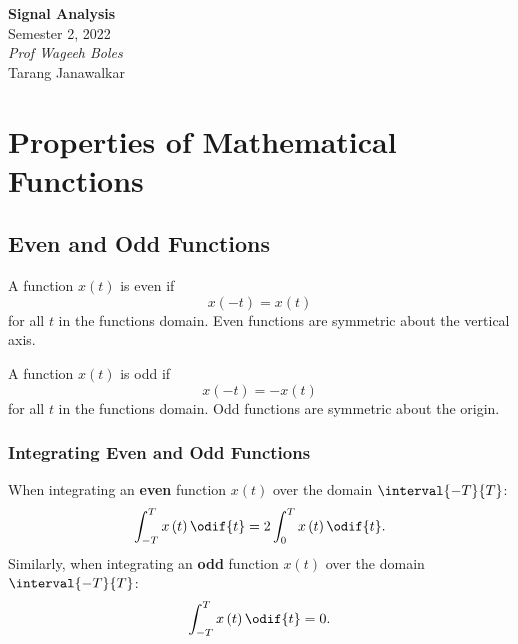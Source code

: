 \documentclass{article}
\date{}
\newcommand{\unitName}{Signal Analysis}
\newcommand{\unitTime}{Semester 2, 2022}
\newcommand{\unitCoordinator}{Prof Wageeh Boles}
\newcommand{\documentAuthors}{Tarang Janawalkar}
\begin{document}
%
\begin{titlepage}
    \vspace*{\fill}
    \begin{center}
        \LARGE{\textbf{\unitName}} \\[0.1in]
        \normalsize{\unitTime} \\[0.2in]
        \normalsize\textit{\unitCoordinator} \\[0.2in]
        \documentAuthors
    \end{center}
    \vspace*{\fill}
    \doclicenseThis
    \thispagestyle{empty}
\end{titlepage}
\newpage
%
\tableofcontents
\newpage
%
\section{Properties of Mathematical Functions}
\subsection{Even and Odd Functions}
\begin{definition}
    A function \(x\left( t \right)\) is even if
    \begin{equation*}
        x\left( -t \right) = x\left( t \right)
    \end{equation*}
    for all \(t\) in the functions domain. Even functions are symmetric about the vertical axis.
\end{definition}
\begin{definition}
    A function \(x\left( t \right)\) is odd if
    \begin{equation*}
        x\left( -t \right) = -x\left( t \right)
    \end{equation*}
    for all \(t\) in the functions domain. Odd functions are symmetric about the origin.
\end{definition}
\subsubsection{Integrating Even and Odd Functions}
When integrating an \textbf{even} function \(x\left( t \right)\) over
the domain \(\interval{-T}{T}\):
\begin{equation*}
    \int_{-T}^T x\left( t \right) \odif{t} = 2 \int_0^T x\left( t \right) \odif{t}.
\end{equation*}
Similarly, when integrating an \textbf{odd} function \(x\left( t \right)\) over the domain \(\interval{-T}{T}\):
\begin{equation*}
    \int_{-T}^T x\left( t \right) \odif{t} = 0.
\end{equation*}
\end{document}
